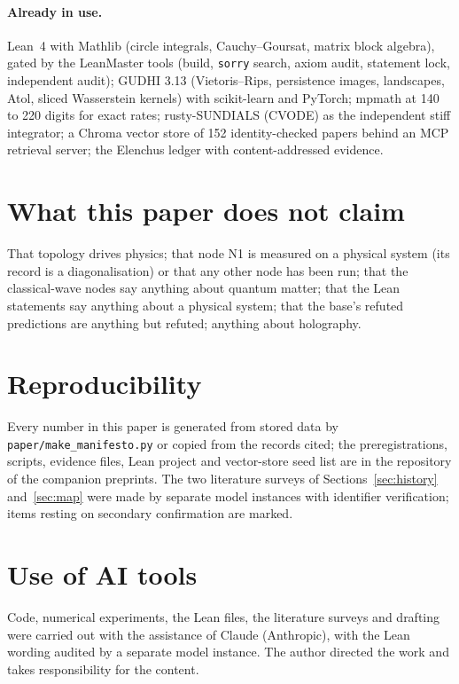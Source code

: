 \documentclass[11pt,a4paper]{article}
\begin{document}
\paragraph{Already in use.} Lean~4 with Mathlib (circle integrals, Cauchy--Goursat, matrix block algebra), gated by the LeanMaster tools (build, \texttt{sorry} search, axiom audit, statement lock, independent audit); GUDHI 3.13 (Vietoris--Rips, persistence images, landscapes, Atol, sliced Wasserstein kernels) with scikit-learn and PyTorch; mpmath at 140 to 220 digits for exact rates; rusty-SUNDIALS (CVODE) as the independent stiff integrator; a Chroma vector store of 152 identity-checked papers behind an MCP retrieval server; the Elenchus ledger with content-addressed evidence.

\section{What this paper does not claim}
That topology drives physics; that node N1 is measured on a physical system (its record is a diagonalisation) or that any other node has been run; that the classical-wave nodes say anything about quantum matter; that the Lean statements say anything about a physical system; that the base's refuted predictions are anything but refuted; anything about holography.

\section*{Reproducibility}
Every number in this paper is generated from stored data by \texttt{paper/make\_manifesto.py} or copied from the records cited; the preregistrations, scripts, evidence files, Lean project and vector-store seed list are in the repository of the companion preprints. The two literature surveys of Sections~\ref{sec:history} and~\ref{sec:map} were made by separate model instances with identifier verification; items resting on secondary confirmation are marked.

\section*{Use of AI tools}
Code, numerical experiments, the Lean files, the literature surveys and drafting were carried out with the assistance of Claude (Anthropic), with the Lean wording audited by a separate model instance. The author directed the work and takes responsibility for the content.
\end{document}
